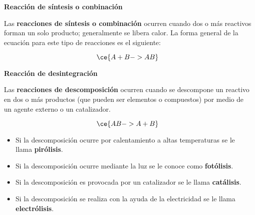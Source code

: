\begin{warncard}[adjusted title={Tipos de reacciones químicas}]
    \begin{center}\bfseries
        Reacción de síntesis o conbinación
    \end{center}

    Las \textbf{reacciones de síntesis o combinación} ocurren cuando dos o más reactivos forman un solo producto; generalmente se libera calor. La forma general de la ecuación para este tipo de reacciones es el siguiente:

    \[\ce{A + B -> AB}\]

    \begin{center}\bfseries
        Reacción de desintegración
    \end{center}

    Las \textbf{reacciones de descomposición} ocurren cuando se descompone un reactivo en dos o más productos (que pueden ser elementos o compuestos) por medio de un agente externo o un catalizador.

    \[\ce{AB -> A + B}\]

    \begin{itemize}
        \item[\color{Red}\faIcon{gripfire}] Si la descomposición ocurre por calentamiento a altas temperaturas se le llama \textbf{\color{Red}pirólisis}.
        \item[\color{orange}\faIcon{sun}] Si la descomposición ocurre mediante la luz se le conoce como \textbf{\color{orange}fotólisis}.
        \item[\color{Brown}\faIcon{flask}] Si la descomposición es provocada por un catalizador se le llama \textbf{\color{Brown}catálisis}.
        \item[\color{Goldenrod}\faIcon{bolt}] Si la descomposición se realiza con la ayuda de la electricidad se le llama \textbf{\color{Goldenrod}electrólisis}.
    \end{itemize}
\end{warncard}